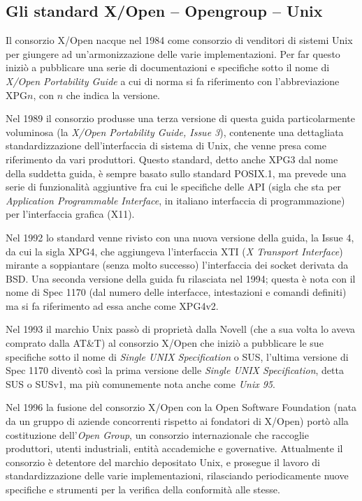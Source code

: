 \subsection{Gli standard X/Open -- Opengroup -- Unix}
\label{sec:intro_xopen}

Il consorzio X/Open nacque nel 1984 come consorzio di venditori di sistemi
Unix per giungere ad un'armonizzazione delle varie implementazioni.  Per far
questo iniziò a pubblicare una serie di documentazioni e specifiche sotto il
nome di \textit{X/Open Portability Guide} a cui di norma si fa riferimento con
l'abbreviazione XPG$n$, con $n$ che indica la versione.

Nel 1989 il consorzio produsse una terza versione di questa guida
particolarmente voluminosa (la \textit{X/Open Portability Guide, Issue 3}),
contenente una dettagliata standardizzazione dell'interfaccia di sistema di
Unix, che venne presa come riferimento da vari produttori. Questo standard,
detto anche XPG3 dal nome della suddetta guida, è sempre basato sullo standard
POSIX.1, ma prevede una serie di funzionalità aggiuntive fra cui le specifiche
delle API (sigla che sta per \textit{Application Programmable Interface}, in
italiano interfaccia di programmazione) per l'interfaccia grafica (X11).

Nel 1992 lo standard venne rivisto con una nuova versione della guida, la
Issue 4, da cui la sigla XPG4, che aggiungeva l'interfaccia XTI (\textit{X
  Transport Interface}) mirante a soppiantare (senza molto successo)
l'interfaccia dei socket derivata da BSD. Una seconda versione della guida fu
rilasciata nel 1994; questa è nota con il nome di Spec 1170 (dal numero delle
interfacce, intestazioni e comandi definiti) ma si fa riferimento ad essa
anche come XPG4v2.

Nel 1993 il marchio Unix passò di proprietà dalla Novell (che a sua volta lo
aveva comprato dalla AT\&T) al consorzio X/Open che iniziò a pubblicare le sue
specifiche sotto il nome di \textit{Single UNIX Specification} o SUS, l'ultima
versione di Spec 1170 diventò così la prima versione delle \textit{Single UNIX
  Specification}, detta SUS o SUSv1, ma più comunemente nota anche come
\textit{Unix 95}.

Nel 1996 la fusione del consorzio X/Open con la Open Software Foundation (nata
da un gruppo di aziende concorrenti rispetto ai fondatori di X/Open) portò
alla costituzione dell'\textit{Open Group}, un consorzio internazionale che
raccoglie produttori, utenti industriali, entità accademiche e governative.
Attualmente il consorzio è detentore del marchio depositato Unix, e prosegue
il lavoro di standardizzazione delle varie implementazioni, rilasciando
periodicamente nuove specifiche e strumenti per la verifica della conformità
alle stesse.

